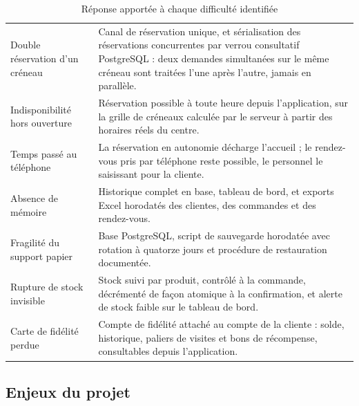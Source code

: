\begin{table}[H]
\centering
\caption{Réponse apportée à chaque difficulté identifiée}
\label{tab:probleme-solution}
\begin{tabularx}{\textwidth}{L{5.2cm} X}
\toprule
{} &  \\
\midrule
Double réservation d'un créneau &
Canal de réservation unique, et sérialisation des réservations concurrentes par
verrou consultatif PostgreSQL : deux demandes simultanées sur le même créneau
sont traitées l'une après l'autre, jamais en parallèle. \\

Indisponibilité hors ouverture &
Réservation possible à toute heure depuis l'application, sur la grille de
créneaux calculée par le serveur à partir des horaires réels du centre. \\

Temps passé au téléphone &
La réservation en autonomie décharge l'accueil ; le rendez-vous pris par
téléphone reste possible, le personnel le saisissant pour la cliente. \\

Absence de mémoire &
Historique complet en base, tableau de bord, et exports Excel horodatés des
clientes, des commandes et des rendez-vous. \\

Fragilité du support papier &
Base PostgreSQL, script de sauvegarde horodatée avec rotation à quatorze jours
et procédure de restauration documentée. \\

Rupture de stock invisible &
Stock suivi par produit, contrôlé à la commande, décrémenté de façon atomique à
la confirmation, et alerte de stock faible sur le tableau de bord. \\

Carte de fidélité perdue &
Compte de fidélité attaché au compte de la cliente : solde, historique, paliers
de visites et bons de récompense, consultables depuis l'application. \\
\bottomrule
\end{tabularx}
\end{table}

\subsection{Enjeux du projet}

